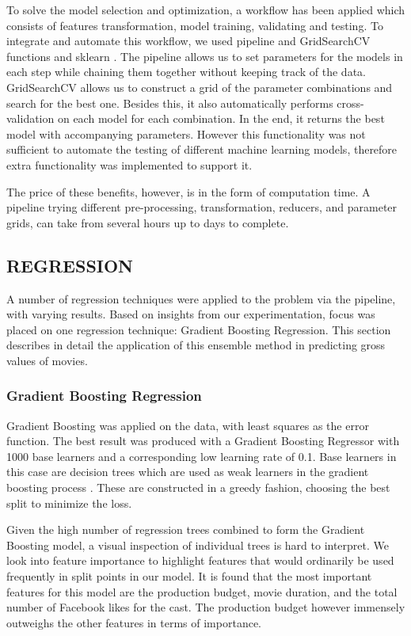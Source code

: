 To solve the model selection and optimization, a  workflow has been applied which consists of features transformation, model training, validating and testing. To integrate and automate this workflow, we used  pipeline and GridSearchCV functions and sklearn \cite{sklearnpipeline}. The pipeline allows us to set parameters for the models in each step while chaining them together without keeping track of the data. GridSearchCV allows us to construct a grid of the parameter combinations and search for the best one. Besides this, it also automatically performs cross-validation on each model for each combination. In the end, it returns the best model with accompanying parameters. However this functionality was not sufficient to automate the testing of different machine learning models, therefore extra functionality was implemented to support it.

 The price of these benefits, however, is in the form of computation time. A pipeline trying different pre-processing, transformation, reducers, and parameter grids,  can take  from several hours up to days to complete. 

\subsection{REGRESSION}
A number of regression techniques were applied to the problem via the pipeline, with varying results. Based on insights from our experimentation, focus was placed on one regression technique: Gradient Boosting Regression. This section describes in detail the application of this ensemble method in predicting gross values of movies. 

\subsubsection{Gradient Boosting Regression}
Gradient Boosting was applied on the data, with least squares as the error function. The best result was produced with a Gradient Boosting Regressor with 1000 base learners and a corresponding low learning rate of 0.1. Base learners in this case are decision trees which are used as weak learners in the gradient boosting process \cite{natekin2013gradient}. These are constructed in a greedy fashion, choosing the best split to minimize the loss. 

Given the high number of regression trees combined to form the Gradient Boosting model, a visual inspection of individual trees is hard to interpret. We look into feature importance to highlight features that would ordinarily be used frequently in split points in our model. It is found that the most important features for this model are the production budget, movie duration, and the total number of Facebook likes for the cast. The production budget however immensely outweighs the other features in terms of importance. 

